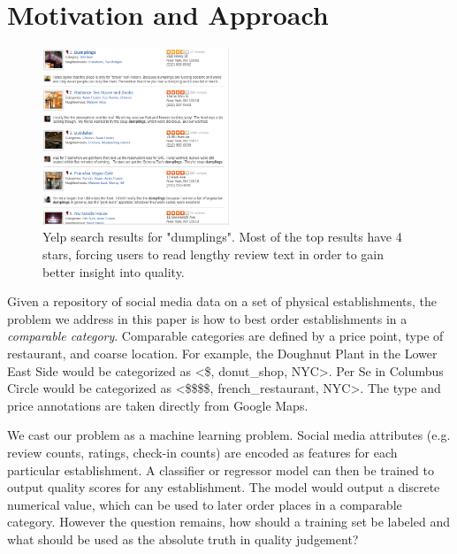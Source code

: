 \section{Motivation and Approach}
\label{sec:setup}

\begin{figure}
  \includegraphics[width=0.5\textwidth]{fig/yelp.png}
  \caption{Yelp search results for "dumplings".
  Most of the top results have 4 stars, forcing users to read lengthy
  review text in order to gain better insight into quality.}
  \label{fig:yelp}
\end{figure}

Given a repository of social media data on a set of physical establishments,
the problem we address in this paper is how to best order establishments in 
a \emph{comparable category}.
Comparable categories are defined by a price point, type of restaurant, and coarse location.
For example, the Doughnut Plant in the Lower East Side would be categorized as <\$, donut\_shop, NYC>.
Per Se in Columbus Circle would be categorized as <\$\$\$\$, french\_restaurant, NYC>.
The type and price annotations are taken directly from Google Maps.

We cast our problem as a machine learning problem.
Social media attributes (e.g. review counts, ratings, check-in counts) are encoded as
features for each particular establishment.
A classifier or regressor model can then be trained to output quality scores for any
establishment. 
The model would output a discrete numerical value, which can be used to later
order places in a comparable category.
However the question remains, how should a training set be labeled
and what should be used as the absolute truth in quality judgement?

